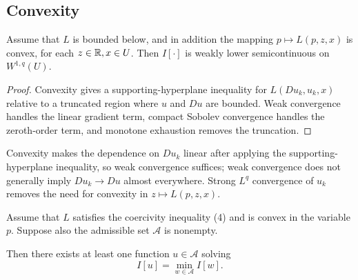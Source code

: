 \subsection{Convexity}
\label{sec:convexity-lower-semicontinuity-existence}

\begin{theorem}
\label{thm:weak-lower-semicontinuity-convex-lagrangian}

Assume that $L$ is bounded below, and in addition the mapping $p \mapsto L(p,z,x)$ is convex, for each $z \in \mathbb{R}, x \in U$. Then $I[\cdot]$ is weakly lower semicontinuous on $W^{1,q}(U)$.
\end{theorem}

\begin{proof}
\sketch Convexity gives a supporting-hyperplane inequality for $L(Du_k,u_k,x)$ relative to a truncated region where $u$ and $Du$ are bounded. Weak convergence handles the linear gradient term, compact Sobolev convergence handles the zeroth-order term, and monotone exhaustion removes the truncation.
\end{proof}

\begin{remark}
\label{rem:weak-lower-semicontinuity-proof-remark}

Convexity makes the dependence on $Du_k$ linear after applying the supporting-hyperplane inequality, so weak convergence suffices; weak convergence does not generally imply $Du_k\to Du$ almost everywhere. Strong $L^q$ convergence of $u_k$ removes the need for convexity in $z\mapsto L(p,z,x)$.
\end{remark}

\begin{theorem}
\label{thm:existence-minimizer-convex-coercive}

Assume that $L$ satisfies the coercivity inequality (4) and is convex in the variable $p$. Suppose also the admissible set $\mathcal{A}$ is nonempty.

Then there exists at least one function $u \in \mathcal{A}$ solving
\[
I[u] = \min_{w \in \mathcal{A}} I[w] .
\]
\end{theorem}


